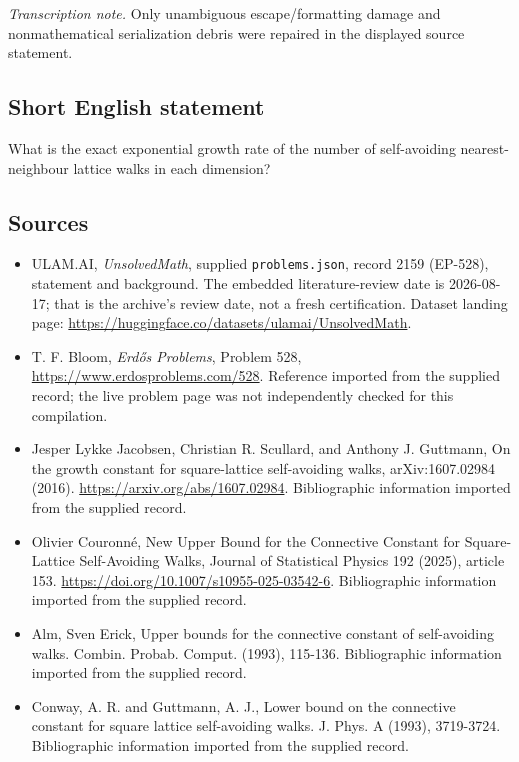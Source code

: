 \documentclass[11pt,a4paper]{article}
\begin{document}
{\small\emph{Transcription note.} Only unambiguous escape/formatting damage and nonmathematical serialization debris were repaired in the displayed source statement.}

\subsection{Short English statement}

What is the exact exponential growth rate of the number of self-avoiding nearest-neighbour lattice walks in each dimension?

\subsection{Sources}

{\small

\begin{itemize}

\item[\hypertarget{source:2159:1}{S1}] ULAM.AI, \emph{UnsolvedMath}, supplied \texttt{problems.json}, record 2159 (EP-528), statement and background. The embedded literature-review date is 2026-08-17; that is the archive’s review date, not a fresh certification. Dataset landing page: \url{https://huggingface.co/datasets/ulamai/UnsolvedMath}.

\item[\hypertarget{source:2159:2}{S2}] T. F. Bloom, \emph{Erdős Problems}, Problem 528, \url{https://www.erdosproblems.com/528}. Reference imported from the supplied record; the live problem page was not independently checked for this compilation.

\item[\hypertarget{source:2159:3}{S3}] Jesper Lykke Jacobsen, Christian R. Scullard, and Anthony J. Guttmann, On the growth constant for square-lattice self-avoiding walks, arXiv:1607.02984 (2016). \url{https://arxiv.org/abs/1607.02984}. Bibliographic information imported from the supplied record.

\item[\hypertarget{source:2159:4}{S4}] Olivier Couronné, New Upper Bound for the Connective Constant for Square-Lattice Self-Avoiding Walks, Journal of Statistical Physics 192 (2025), article 153. \url{https://doi.org/10.1007/s10955-025-03542-6}. Bibliographic information imported from the supplied record.

\item[\hypertarget{source:2159:5}{S5}] Alm, Sven Erick, Upper bounds for the connective constant of self-avoiding walks. Combin. Probab. Comput. (1993), 115-136. Bibliographic information imported from the supplied record.

\item[\hypertarget{source:2159:6}{S6}] Conway, A. R. and Guttmann, A. J., Lower bound on the connective constant for square lattice self-avoiding walks. J. Phys. A (1993), 3719-3724. Bibliographic information imported from the supplied record.

\end{itemize}

}

\label{end:2159}
\end{document}
